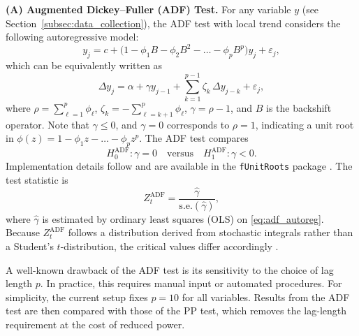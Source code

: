 \documentclass[10pt,a4paper,oneside]{article}
\begin{document}
\noindent \textbf{(A) Augmented Dickey--Fuller (ADF) Test.}
For any variable \(y\) (see Section~\ref{subsec:data_collection}), the ADF test with local trend considers the following autoregressive model:
\[
y_j 
= 
c + \bigl(1 - \phi_1 B - \phi_2 B^2 - \dots - \phi_p B^p\bigr) y_j 
+ 
\varepsilon_j,
\]
which can be equivalently written as
\begin{equation}
\Delta y_j 
= 
\alpha + \gamma y_{j - 1} 
+ 
\sum_{k = 1}^{p - 1} \zeta_k \,\Delta y_{j - k} 
+ 
\varepsilon_j,
\label{eq:adf_autoreg}
\end{equation}
where \(\rho = \sum_{\ell=1}^{p}\phi_\ell\), \(\zeta_k = -\sum_{\ell=k+1}^{p}\phi_\ell\), \(\gamma = \rho - 1\), and \(B\) is the backshift operator. Note that \(\gamma \le 0\), and \(\gamma = 0\) corresponds to \(\rho = 1\), indicating a unit root in \(\phi(z) = 1 - \phi_1 z - \dots - \phi_p z^p\). The ADF test compares
\[
H_0^{\text{ADF}}: \gamma = 0 
\quad \text{versus} \quad
H_1^{\text{ADF}}: \gamma < 0.
\]
Implementation details follow \cite{banerjee1993co} and are available in the \verb|fUnitRoots| package \cite{funitroots2024}. The test statistic is
\[
Z^{\text{ADF}}_t 
= 
\frac{\hat{\gamma}}{\text{s.e.}(\hat{\gamma})},
\]
where \(\hat{\gamma}\) is estimated by ordinary least squares (OLS) on \eqref{eq:adf_autoreg}. Because \(Z^{\text{ADF}}_t\) follows a distribution derived from stochastic integrals rather than a Student’s \(t\)-distribution, the critical values differ accordingly \cite{banerjee1993co}.

A well-known drawback of the ADF test is its sensitivity to the choice of lag length \(p\). In practice, this requires manual input or automated procedures. For simplicity, the current setup fixes \(p = 10\) for all variables. Results from the ADF test are then compared with those of the PP test, which removes the lag-length requirement at the cost of reduced power.
\end{document}
